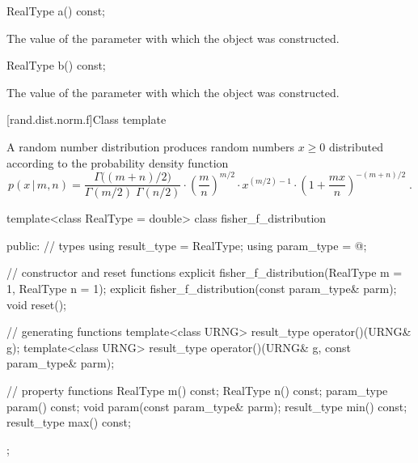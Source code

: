 %
%
\begin{itemdecl}
RealType a() const;
\end{itemdecl}

\begin{itemdescr}
\pnum\returns The value of the  parameter
 with which the object was constructed.
\end{itemdescr}

%
%
\begin{itemdecl}
RealType b() const;
\end{itemdecl}

\begin{itemdescr}
\pnum\returns The value of the  parameter
 with which the object was constructed.
\end{itemdescr}


[rand.dist.norm.f]{Class template }%
%

\pnum
A  random number distribution
produces random numbers $x\ge0$
distributed according to
the probability density function%
%
\[%
 p(x\,|\,m,n)
      = \frac{\Gamma\big((m+n)/2\big)}
             {\Gamma(m/2) \; \Gamma(n/2)}
        \cdot
        \left(\frac{m}{n}\right)^{m/2}
        \cdot
        x^{(m/2)-1}
        \cdot
        {\left( 1 + \frac{m x}{n}  \right)}^{-(m+n)/2}
\; \mbox{.}
\]

\begin{codeblock}
template<class RealType = double>
 class fisher_f_distribution
{
public:
 // types
 using result_type = RealType;
 using param_type  = @\unspec@;

 // constructor and reset functions
 explicit fisher_f_distribution(RealType m = 1, RealType n = 1);
 explicit fisher_f_distribution(const param_type& parm);
 void reset();

 // generating functions
 template<class URNG>
   result_type operator()(URNG& g);
 template<class URNG>
   result_type operator()(URNG& g, const param_type& parm);

 // property functions
 RealType m() const;
 RealType n() const;
 param_type param() const;
 void param(const param_type& parm);
 result_type min() const;
 result_type max() const;
};
\end{codeblock}


